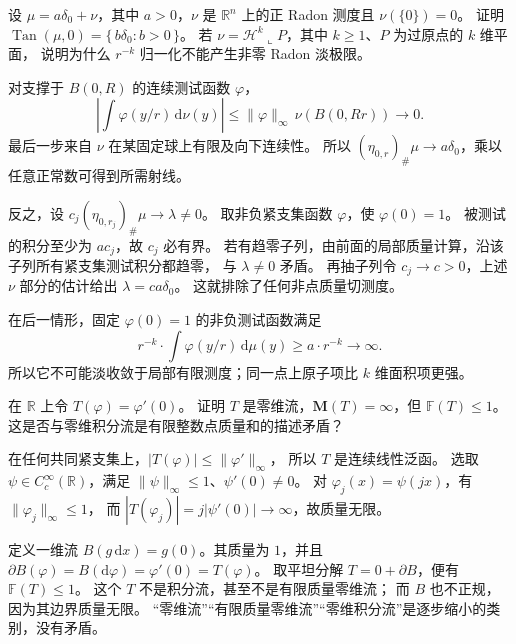 \BookExercises

\begin{exercise}\label{b1:ex:app-d-atomic-tangents}
设 \(\mu=a\delta_0+\nu\)，其中 \(a>0\)，\(\nu\) 是
\(\mathbb R^n\) 上的正 Radon 测度且 \(\nu(\{0\})=0\)。
证明 \(\operatorname{Tan}(\mu,0)=\{\,b\delta_0:b>0\,\}\)。
若 \(\nu=\mathcal H^k\llcorner P\)，其中 \(k\geq1\)、\(P\) 为过原点的 \(k\) 维平面，
说明为什么 \(r^{-k}\) 归一化不能产生非零 Radon 淡极限。
\end{exercise}
\begin{solution}
对支撑于 \(B(0,R)\) 的连续测试函数 \(\varphi\)，
\[
 \left|\int\varphi(y/r)\,\mathrm{d}\nu(y)\right|
       \leq\|\varphi\|_\infty\,\nu(B(0,Rr))\longrightarrow0.
\]
最后一步来自 \(\nu\) 在某固定球上有限及向下连续性。
所以 \((\eta_{0,r})_\#\mu\rightarrow a\delta_0\)，乘以任意正常数可得到所需射线。

反之，设 \(c_j(\eta_{0,r_j})_\#\mu\rightarrow\lambda\neq0\)。
取非负紧支集函数 \(\varphi\)，使 \(\varphi(0)=1\)。
被测试的积分至少为 \(ac_j\)，故 \(c_j\) 必有界。
若有趋零子列，由前面的局部质量计算，沿该子列所有紧支集测试积分都趋零，
与 \(\lambda\neq0\) 矛盾。
再抽子列令 \(c_j\rightarrow c>0\)，上述 \(\nu\) 部分的估计给出
\(\lambda=ca\delta_0\)。
这就排除了任何非点质量切测度。

在后一情形，固定 \(\varphi(0)=1\) 的非负测试函数满足
\[
 r^{-k}\cdot\int\varphi(y/r)\,\mathrm{d}\mu(y)\geq a\cdot r^{-k}\longrightarrow\infty.
\]
所以它不可能淡收敛于局部有限测度；同一点上原子项比 \(k\) 维面积项更强。
\end{solution}

\begin{exercise}\label{b1:ex:app-d-dirac-derivative}
在 \(\mathbb R\) 上令 \(T(\varphi)=\varphi'(0)\)。
证明 \(T\) 是零维流，\(\mathbf M(T)=\infty\)，但 \(\mathbb F(T)\leq1\)。
这是否与零维积分流是有限整数点质量和的描述矛盾？
\end{exercise}
\begin{solution}
在任何共同紧支集上，\(|T(\varphi)|\leq\|\varphi'\|_\infty\)，
所以 \(T\) 是连续线性泛函。
选取 \(\psi\in C_c^\infty(\mathbb R)\)，满足
\(\|\psi\|_\infty\leq1\)、\(\psi'(0)\neq0\)。
对 \(\varphi_j(x)=\psi(jx)\)，有 \(\|\varphi_j\|_\infty\leq1\)，
而 \(|T(\varphi_j)|=j|\psi'(0)|\rightarrow\infty\)，故质量无限。

定义一维流 \(B(g\,\mathrm{d}x)=g(0)\)。其质量为 \(1\)，并且
\(\partial B(\varphi)=B(\mathrm{d}\varphi)=\varphi'(0)=T(\varphi)\)。
取平坦分解 \(T=0+\partial B\)，便有 \(\mathbb F(T)\leq1\)。
这个 \(T\) 不是积分流，甚至不是有限质量零维流；
而 \(B\) 也不正规，因为其边界质量无限。
“零维流”“有限质量零维流”“零维积分流”是逐步缩小的类别，没有矛盾。
\end{solution}

